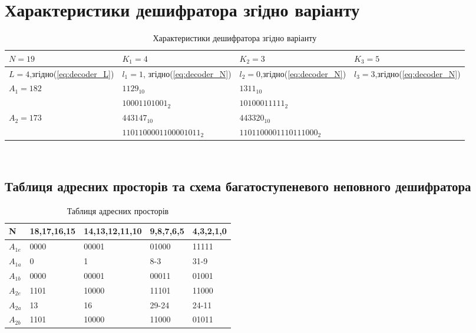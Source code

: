\section{Характеристики дешифратора згідно варіанту}
\begin{center}
\begin{table}[h!]
\begin{tabu}{ | X[-3,l] | X[6,l] | X[6,l] | X[-3,l]|}
\hline
$N=19$ & $K_{1}=4$ & $K_{2}=3$  & $K_{3}=5$ \\
\hline
$L=4$,\newline згідно(\ref{eq:decoder_L}) & $l_{1}=1$, \newline згідно(\ref{eq:decoder_N}) & $l_{2}=0$,\newline згідно(\ref{eq:decoder_N}) & $l_{3}=3$,\newline згідно(\ref{eq:decoder_N}) \\
\hline
$A_{1}=182$ & $1129_{10}$ & $1311_{10}$ &  \\
\hline
& $10001101001_{2}$ & $10100011111_{2}$ &  \\
\hline
$A_{2}=173$ & $443147_{10}$ & $443320_{10}$ &   \\
\hline
& $1101100001100001011_{2}$ & $1101100001110111000_{2}$ &  \\
\hline
\end{tabu}
\vspace{6mm}\\
\caption{Характеристики дешифратора згідно варіанту}\label{tab:decoder_spec}
\end{table}
\end{center}
\subsection{Таблиця адресних просторів та схема багатоступеневого неповного дешифратора}
\begin{center}
\begin{table}[h!]
\begin{tabu}{ | X[-3,l] | X[-3,l] | X[-3,l] | X[-3,l] |X[-3,l] |}
\hline
N & 18,17,16,15 & 14,13,12,11,10 & 9,8,7,6,5 & 4,3,2,1,0 \\
 \hline
$A_{1e}$ & 0000 & 00001 & 01000 & 11111  \\
\hline
$A_{1a}$ &  0 & 1  &  8-3 & 31-9  \\
\hline
$A_{1b}$ & 0000 & 00001 & 00011 & 01001   \\
\hline
$A_{2e}$ & 1101 & 10000 & 11101 & 11000  \\
\hline
$A_{2a}$ & 13 & 16 & 29-24 & 24-11  \\
\hline
$A_{2b}$ & 1101 & 10000 & 11000 & 01011  \\
\hline
\end{tabu}
\vspace{6mm}\\
\caption{Таблиця адресних просторів}\label{tab:decoder_addr}
\end{table}
\end{center}

\newpage
